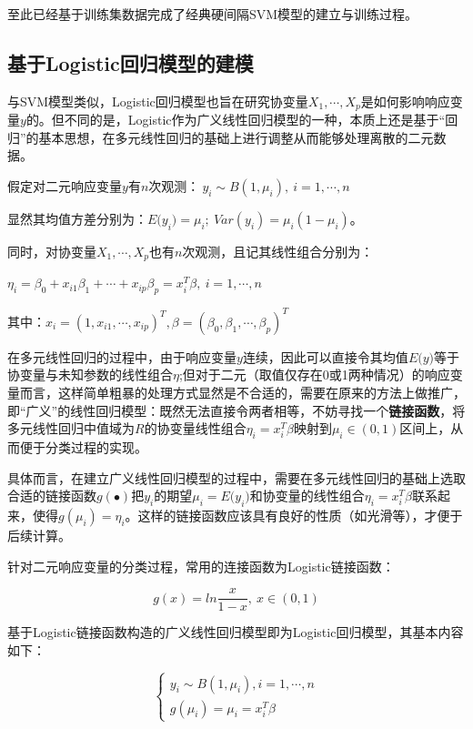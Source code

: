 \documentclass[12pt]{article}  %
\begin{document}
至此已经基于训练集数据完成了经典硬间隔SVM模型的建立与训练过程。

\subsection{基于Logistic回归模型的建模}

与SVM模型类似，Logistic回归模型也旨在研究协变量$X_1,\cdots,X_p$是如何影响响应变量$y$的。但不同的是，Logistic作为广义线性回归模型的一种，本质上还是基于“回归”的基本思想，在多元线性回归的基础上进行调整从而能够处理离散的二元数据。

假定对二元响应变量$y$有$n$次观测：$\ y_i \sim B(1,\mu_i),\ i=1,\cdots,n$

显然其均值方差分别为：${E(y}_i)=\mu_i;\ Var(y_i)=\mu_i(1-\mu_i)$。

同时，对协变量$X_1,\cdots,X_p$也有$n$次观测，且记其线性组合分别为：

$\eta_i=\beta_0+x_{i1}\beta_1+\cdots+x_{ip}\beta_p=x_i^T\beta,\ i=1,\cdots,n$

其中：$x_i={(1,x_{i1},\cdots,x_{ip})}^T, \beta={(\beta_0,\beta_1,\cdots,\beta_p)}^T$

在多元线性回归的过程中，由于响应变量$y$连续，因此可以直接令其均值${E(y})$等于协变量与未知参数的线性组合$\eta$;但对于二元（取值仅存在0或1两种情况）的响应变量而言，这样简单粗暴的处理方式显然是不合适的，需要在原来的方法上做推广，即“广义”的线性回归模型：既然无法直接令两者相等，不妨寻找一个\textbf{链接函数}，将多元线性回归中值域为$R$的协变量线性组合$\eta_i=x_i^T\beta$映射到$\mu_i\in(0,1)$区间上，从而便于分类过程的实现。

具体而言，在建立广义线性回归模型的过程中，需要在多元线性回归的基础上选取合适的链接函数$g(\bullet)$把$y_i$的期望$\mu_i={E(y}_i)$和协变量的线性组合$\eta_i=x_i^T\beta$联系起来，使得$g(\mu_i)=\eta_i$。这样的链接函数应该具有良好的性质（如光滑等），才便于后续计算。

针对二元响应变量的分类过程，常用的连接函数为Logistic链接函数：

\begin{equation}
	g(x)=ln{\frac{x}{1-x}},\ x\in(0,1)
\end{equation}

基于Logistic链接函数构造的广义线性回归模型即为Logistic回归模型，其基本内容如下：

\begin{equation} 
	\begin{cases}
		 y_i \sim B(1,\mu_i), i=1,\cdots,n \\
		 g(\mu_i)=\mu_i=x_i^T\beta        
	\end{cases}
\end{equation}
\end{document}

